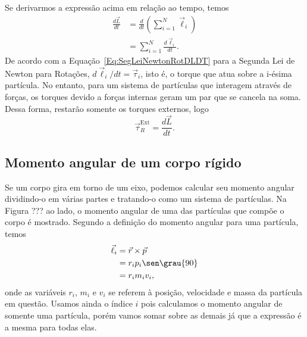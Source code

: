 Se derivarmos a expressão acima em relação ao tempo, temos
\begin{align}
  \frac{d\vec{L}}{dt} &= \frac{d}{dt}\left(\sum_{i=1}^N\vec{\ell}_i\right) \\
  &= \sum_{i=1}^N \frac{d\vec{\ell}_i}{dt}.
\end{align}
%
De acordo com a Equação~\ref{Eq:SegLeiNewtonRotDLDT} para a Segunda Lei de Newton para Rotações, $d\vec{\ell}_i/dt = \vec{\tau}_i$, isto é, o torque que atua sobre a i-ésima partícula. No entanto, para um sistema de partículas que interagem através de forças, os torques devido a forças internas geram um par que se cancela na soma. Dessa forma, restarão somente os torques externos, logo
\begin{equation}\label{Eq:SegLeiNewtonRotSisPartDLDT}
  \vec{\tau}_R^{\textrm{Ext}} = \frac{d\vec{L}}{dt}.
\end{equation}

\subsection{Momento angular de um corpo rígido}

Se um corpo gira em torno de um eixo, podemos calcular seu momento angular dividindo-o em várias partes e tratando-o como um sistema de partículas. Na Figura ??? ao lado, o momento angular de uma das partículas que compõe o corpo é mostrado. Segundo a definição do momento angular para uma partícula, temos
\begin{align}
  \vec{\ell}_i &= \vec{r}\times\vec{p} \\
  &= r_i p_i \sen \grau{90} \\
  &= r_i m_i v_i,
\end{align}
%
onde as variáveis $r_i$, $m_i$ e $v_i$ se referem à posição, velocidade e massa da partícula em questão. Usamos ainda o índice $i$ pois calculamos o momento angular de somente uma partícula, porém vamos somar sobre as demais já que a expressão é a mesma para todas elas.

